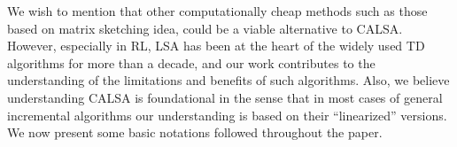 We wish to mention that other computationally cheap methods such as those based on matrix sketching idea, could be a viable alternative to  CALSA. However, especially in RL, LSA has been at the heart of the widely used TD algorithms for more than a decade, and our work contributes to the understanding of the limitations and benefits of such algorithms. Also, we believe understanding CALSA is foundational in the sense that in most cases of general incremental algorithms our understanding is based on their ``linearized'' versions. We now present some basic notations followed throughout the paper.

